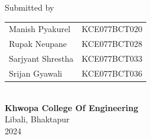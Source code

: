 \begin{center}
	\vspace{0.2in}
	\large{Submitted by}\\
	\vspace{0.1in}
	\begin{tabular}{p{3.5in}p{2in}}
		\hspace{0.3cm}Manish Pyakurel& \hspace{1cm}KCE077BCT020\\
		\hspace{0.3cm}Rupak Neupane& \hspace{1cm}KCE077BCT028\\
		\hspace{0.3cm}Sarjyant Shrestha& \hspace{1cm}KCE077BCT033\\
		\hspace{0.3cm}Srijan Gyawali& \hspace{1cm}KCE077BCT036\\
	\end{tabular}
	\\
	\vspace{1cm}
		\vspace{0.8cm}
	\large{\textbf{Khwopa College Of Engineering}\\}
		\normalsize{Libali, Bhaktapur\\
		2024
	}
\end{center}
